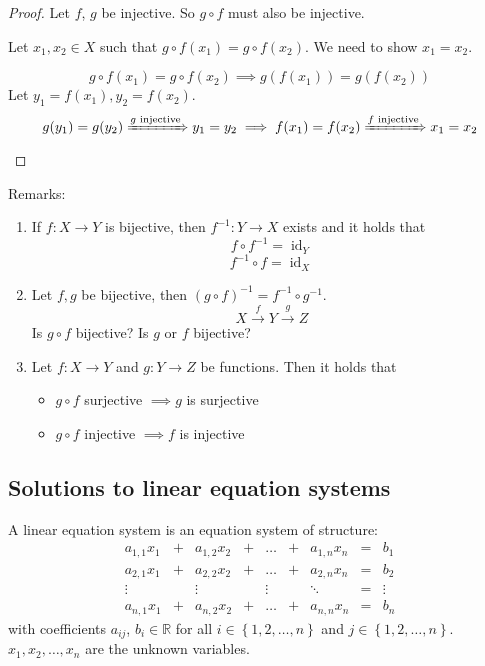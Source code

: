 \documentclass[a4paper,landscape,twocolumn]{article}
\newcommand\set[1]{\left\{#1\right\}}
\begin{document}
\begin{proof}
  Let $f$, $g$ be injective. So $g\circ f$ must also be injective.

  Let $x_1,x_2 \in X$ such that $g\circ f(x_1) = g \circ f(x_2)$.
  We need to show $x_1 = x_2$.

  \[ g\circ f(x_1) = g\circ f(x_2) \implies g(f(x_1)) = g(f(x_2)) \]
  Let $y_1 = f(x_1), y_2 = f(x_2)$.
  \[ g(y_1) = g(y_2) \xRightarrow{g \text{ injective}} y_1 = y_2 
     \implies f(x_1) = f(x_2) \xRightarrow{f \text{ injective}} x_1 = x_2 \]
\end{proof}
Remarks:
\begin{enumerate}
  \item
    If $f: X \rightarrow Y$ is bijective, then $f^{-1}: Y \rightarrow X$ exists and it holds that
    \[ f\circ f^{-1} = \operatorname{id}_Y \]
    \[ f^{-1}\circ f = \operatorname{id}_X \]

  \item
    Let $f,g$ be bijective, then $(g\circ f)^{-1} = f^{-1} \circ g^{-1}$.
    \[ X \xrightarrow{f} Y \xrightarrow{g} Z \]
    Is $g\circ f$ bijective? Is $g$ or $f$ bijective?

  \item
    Let $f: X \to Y$ and $g: Y \to Z$ be functions.
    Then it holds that
    \begin{itemize}
      \item $g \circ f$ surjective $\implies g$ is surjective
      \item $g \circ f$ injective $\implies f$ is injective
    \end{itemize}
\end{enumerate}

\subsection{Solutions to linear equation systems}
%
A linear equation system is an equation system of structure:
\[
  \begin{array}{ccccccccc}
    a_{1,1} x_1 &+& a_{1,2} x_2 &+& \ldots &+& a_{1,n} x_n &=& b_1 \\
    a_{2,1} x_1 &+& a_{2,2} x_2 &+& \ldots &+& a_{2,n} x_n &=& b_2 \\
      \vdots    & & \vdots      & & \vdots & & \ddots      &=& \vdots \\
    a_{n,1} x_1 &+& a_{n,2} x_2 &+& \ldots &+& a_{n,n} x_n &=& b_n
  \end{array}
\]
with coefficients $a_{ij}$, $b_i \in \mathbb{R}$ for all $i \in \set{1,2,\ldots,n}$ and $j \in \set{1,2,\ldots,n}$.
$x_1,x_2,\ldots,x_n$ are the unknown variables.
\end{document}
